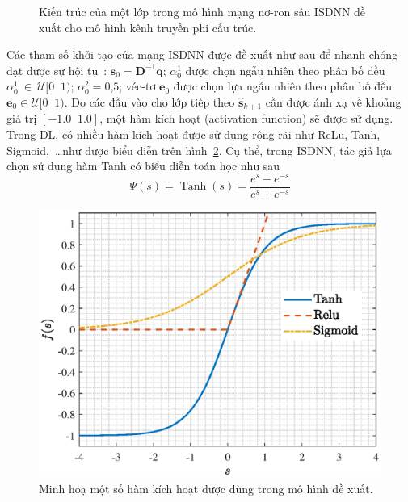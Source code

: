 \begin{figure}[ht]
    \caption{Kiến trúc của một lớp trong mô hình mạng nơ-ron sâu ISDNN đề xuất cho mô hình kênh truyền phi cấu trúc.}
    \label{fig:ISD}
\end{figure}

Các tham số khởi tạo của mạng ISDNN được đề xuất như sau để nhanh chóng đạt được sự hội tụ~\cite{Narasimhan2014}: $\mathbf{s}_0 = \mathbf{D}^{-1}\mathbf{q}$; $\alpha^1_0$ được chọn ngẫu nhiên theo phân bố đều $\alpha^1_0~\in~\mathcal{U}[0 \;\; 1)$; $\alpha^2_0 = 0$,$5$; véc-tơ $\mathbf{e}_0$ được chọn lựa ngẫu nhiên theo phân bố đều $\mathbf{e}_0 \in  \mathcal{U}[0 \;\; 1)$. Do các đầu vào cho lớp tiếp theo $\hat{\mathbf{s}}_{k+1}$ cần được ánh xạ về khoảng giá trị $[-1.0 \;\; 1.0]$, một hàm kích hoạt (activation function) sẽ được sử dụng. Trong DL, có nhiều hàm kích hoạt được sử dụng rộng rãi như ReLu, Tanh, Sigmoid,~\ldots như được biểu diễn trên hình~\ref{fig:tanh}. Cụ thể, trong ISDNN, tác giả lựa chọn sử dụng hàm Tanh có biểu diễn toán học như sau
\begin{equation}
    \Psi(s) = \operatorname{Tanh}(s) = \frac{e^s - e^{-s}}{e^s + e^{-s}}
\end{equation}
\begin{figure}[ht]
    \centering
    \includegraphics[width=.8\linewidth]{figures/tanh.eps}
    \caption{Minh hoạ một số hàm kích hoạt được dùng trong mô hình đề xuất.}
    \label{fig:tanh}
\end{figure}

